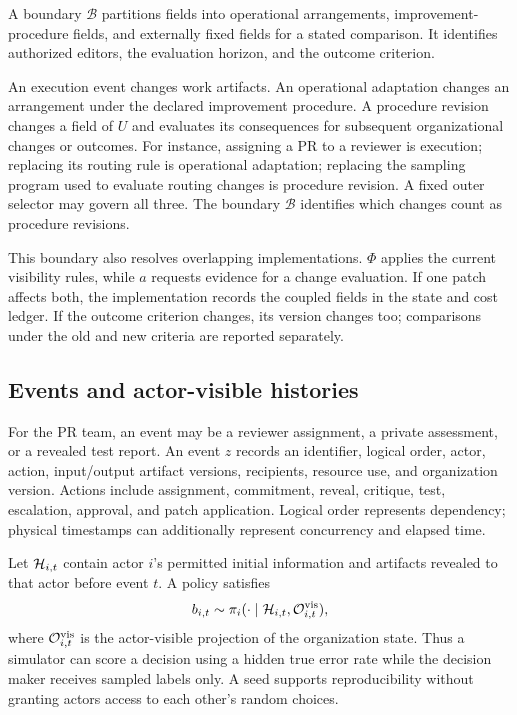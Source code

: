 \begin{definition}
A boundary $\mathcal B$ partitions fields into operational arrangements, improvement-procedure fields, and externally fixed fields for a stated comparison. It identifies authorized editors, the evaluation horizon, and the outcome criterion.
\end{definition}
An execution event changes work artifacts. An operational adaptation changes an arrangement under the declared improvement procedure. A procedure revision changes a field of $U$ and evaluates its consequences for subsequent organizational changes or outcomes. For instance, assigning a PR to a reviewer is execution; replacing its routing rule is operational adaptation; replacing the sampling program used to evaluate routing changes is procedure revision. A fixed outer selector may govern all three. The boundary $\mathcal B$ identifies which changes count as procedure revisions.

This boundary also resolves overlapping implementations. $\Phi$ applies the current visibility rules, while $a$ requests evidence for a change evaluation. If one patch affects both, the implementation records the coupled fields in the state and cost ledger. If the outcome criterion changes, its version changes too; comparisons under the old and new criteria are reported separately.

\subsection{Events and actor-visible histories}
For the PR team, an event may be a reviewer assignment, a private assessment, or a revealed test report. An event $z$ records an identifier, logical order, actor, action, input/output artifact versions, recipients, resource use, and organization version. Actions include assignment, commitment, reveal, critique, test, escalation, approval, and patch application. Logical order represents dependency; physical timestamps can additionally represent concurrency and elapsed time.

Let $\mathcal{H}_{i,t}$ contain actor $i$'s permitted initial information and artifacts revealed to that actor before event $t$. A policy satisfies
\begin{equation}
b_{i,t}\sim\pi_i(\cdot\mid\mathcal{H}_{i,t},\mathcal{O}^{\mathrm{vis}}_{i,t}),
\label{eq:information}
\end{equation}
where $\mathcal{O}^{\mathrm{vis}}_{i,t}$ is the actor-visible projection of the organization state. Thus a simulator can score a decision using a hidden true error rate while the decision maker receives sampled labels only. A seed supports reproducibility without granting actors access to each other's random choices.


